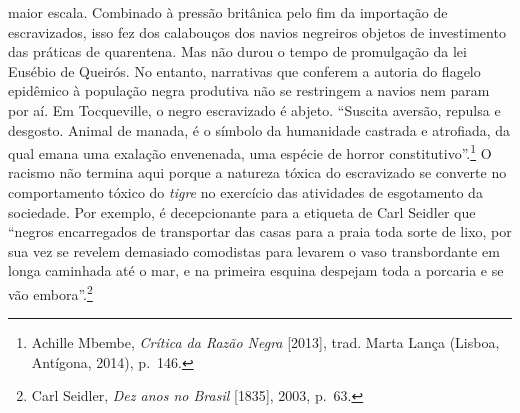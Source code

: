 maior escala. Combinado à pressão britânica pelo fim da importação de
escravizados, isso fez dos calabouços dos navios negreiros objetos de
investimento das práticas de quarentena. Mas não durou o tempo de
promulgação da lei Eusébio de Queirós. No entanto, narrativas que
conferem a autoria do flagelo epidêmico à população negra produtiva não
se restringem a navios nem param por aí. Em Tocqueville, o negro
escravizado é abjeto. ``Suscita aversão, repulsa e desgosto. Animal de
manada, é o símbolo da humanidade castrada e atrofiada, da qual emana
uma exalação envenenada, uma espécie de horror constitutivo''.\footnote{Achille
  Mbembe, \emph{Crítica da Razão Negra} {[}2013{]}, trad. Marta Lança
  (Lisboa, Antígona, 2014), p.~146.} O racismo não termina aqui porque a
natureza tóxica do escravizado se converte no comportamento tóxico do
\emph{tigre} no exercício das atividades de esgotamento da sociedade.
Por exemplo, é decepcionante para a etiqueta de Carl Seidler que
``negros encarregados de transportar das casas para a praia toda sorte
de lixo, por sua vez se revelem demasiado comodistas para levarem o vaso
transbordante em longa caminhada até o mar, e na primeira esquina
despejam toda a porcaria e se vão embora''.\footnote{Carl Seidler,
  \emph{Dez anos no Brasil} {[}1835{]}, 2003, p.~63.}


